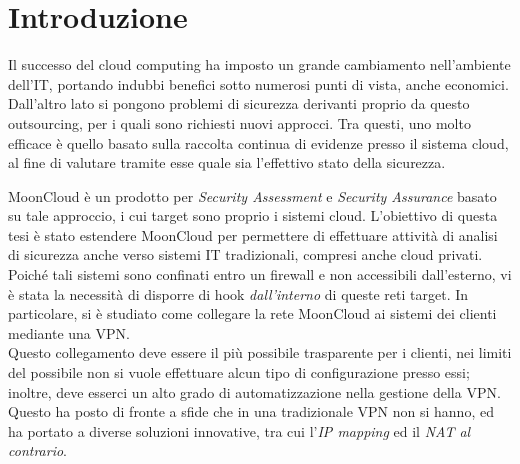 \chapter*{Introduzione}

Il successo del cloud computing ha imposto un grande cambiamento nell'ambiente dell'IT,
portando indubbi benefici sotto numerosi punti di vista, anche economici. Dall'altro
lato si pongono problemi di sicurezza derivanti proprio da questo outsourcing, per i
quali sono richiesti nuovi approcci. Tra questi, uno molto efficace è quello basato
sulla raccolta continua di evidenze presso il sistema cloud, al fine di valutare
tramite esse quale sia l'effettivo stato della sicurezza.


MoonCloud è un prodotto per \textit{Security Assessment}  e \textit{Security Assurance}
basato su tale approccio, 
i cui target sono proprio i sistemi cloud. L'obiettivo di questa tesi è stato
estendere MoonCloud per permettere di effettuare attività di analisi di sicurezza anche
verso sistemi IT tradizionali, compresi anche cloud privati. Poiché tali sistemi
sono confinati entro un firewall e non accessibili dall'esterno, vi è stata la necessità
di disporre di hook \textit{dall'interno} di queste reti target. In particolare,
si è studiato come collegare la rete MoonCloud ai sistemi dei clienti mediante
una VPN.\\
Questo collegamento deve essere il più possibile trasparente per i clienti, nei limiti
del possibile non si vuole effettuare alcun tipo di configurazione presso essi; inoltre,
deve esserci un alto grado di automatizzazione nella gestione della VPN.
Questo ha posto di fronte a sfide che in una tradizionale VPN non si hanno, ed ha portato
a diverse soluzioni innovative, tra cui l'\textit{IP mapping} ed il \textit{NAT al contrario}.


